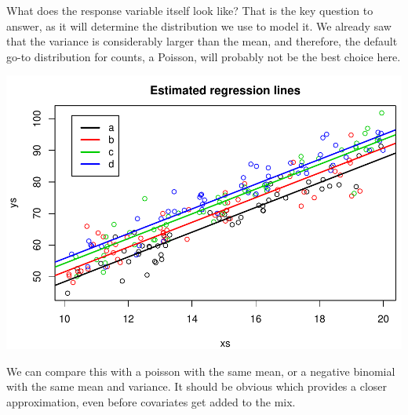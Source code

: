 \documentclass[
]{book}
\newenvironment{Shaded}{\begin{snugshade}}{\end{snugshade}}
\newcommand{\AttributeTok}[1]{\textcolor[rgb]{0.13,0.29,0.53}{#1}}
\newcommand{\DecValTok}[1]{\textcolor[rgb]{0.00,0.00,0.81}{#1}}
\newcommand{\FunctionTok}[1]{\textcolor[rgb]{0.13,0.29,0.53}{\textbf{#1}}}
\newcommand{\NormalTok}[1]{#1}
\newcommand{\SpecialCharTok}[1]{\textcolor[rgb]{0.81,0.36,0.00}{\textbf{#1}}}
\newcommand{\StringTok}[1]{\textcolor[rgb]{0.31,0.60,0.02}{#1}}
\begin{document}
What does the response variable itself look like? That is the key question to answer, as it will determine the distribution we use to model it. We already saw that the variance is considerably larger than the mean, and therefore, the default go-to distribution for counts, a Poisson, will probably not be the best choice here.

\begin{Shaded}
\end{Shaded}

\includegraphics{ECOMODbook_files/figure-latex/unnamed-chunk-91-1.pdf}

We can compare this with a poisson with the same mean, or a negative binomial with the same mean and variance. It should be obvious which provides a closer approximation, even before covariates get added to the mix.
\end{document}
